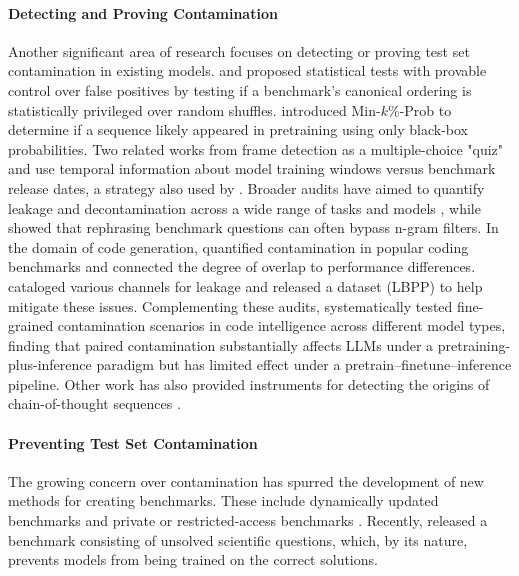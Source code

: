 \paragraph{Detecting and Proving Contamination}
Another significant area of research focuses on detecting or proving test set contamination in existing models. \citet{oren2023proving} and \citet{ni2025trainingbenchmarkneed} proposed statistical tests with provable control over false positives by testing if a benchmark's canonical ordering is statistically privileged over random shuffles. \citet{shi2024detecting} introduced Min-$k\%$-Prob to determine if a sequence likely appeared in pretraining using only black-box probabilities. Two related works from \citet{golchin2023data,golchin2024time} frame detection as a multiple-choice "quiz" and use temporal information about model training windows versus benchmark release dates, a strategy also used by \citet{roberts2024to}. Broader audits have aimed to quantify leakage and decontamination across a wide range of tasks and models \citep{xu2024benchmarkingbenchmarkleakagelarge,deng2024investigating,li2024opensource}, while \citet{yang2023rethinking} showed that rephrasing benchmark questions can often bypass n-gram filters. In the domain of code generation, \citet{riddell2024quantifying} quantified contamination in popular coding benchmarks and connected the degree of overlap to performance differences. \citet{matton2024leakage} cataloged various channels for leakage and released a dataset (LBPP) to help mitigate these issues. Complementing these audits, \citet{yang2025rethinkingeffectsdatacontamination} systematically tested fine-grained contamination scenarios in code intelligence across different model types, finding that paired contamination substantially affects LLMs under a pretraining-plus-inference paradigm but has limited effect under a pretrain--finetune--inference pipeline. Other work has also provided instruments for detecting the origins of chain-of-thought sequences \citep{li2025diagnosing}.

\paragraph{Preventing Test Set Contamination}
The growing concern over contamination has spurred the development of new methods for creating benchmarks. These include dynamically updated benchmarks \citep{jain2025livecodebench, xia2024top, zhang2025dynamicbenchmarkconstructionevaluating, qian2024varbenchrobustlanguagemodel} and private or restricted-access benchmarks \citep{zhang2024carefulexaminationlargelanguage, glazer2025frontiermathbenchmarkevaluatingadvanced}. Recently, \citet{nie2025uqassessinglanguagemodels} released a benchmark consisting of unsolved scientific questions, which, by its nature, prevents models from being trained on the correct solutions.

